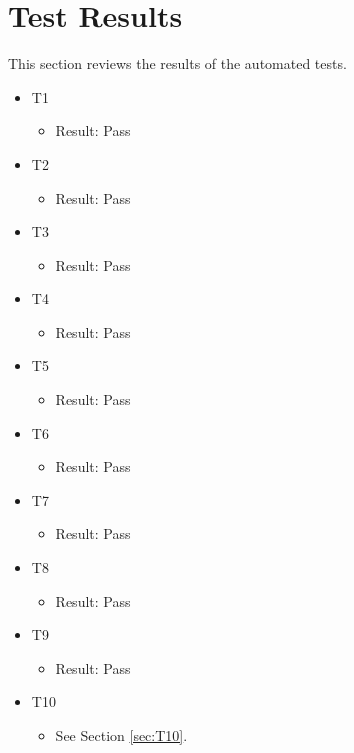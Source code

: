 \documentclass[12pt, titlepage]{article}
\begin{document}
\section{Test Results}
This section reviews the results of the automated tests.

\begin{itemize}
    \item T1
    \begin{itemize}
    \item Result: Pass
    \end{itemize}
    \item T2
    \begin{itemize}
    \item Result: Pass
    \end{itemize}
    \item T3
    \begin{itemize}
    \item Result: Pass
    \end{itemize}
    \item T4
    \begin{itemize}
    \item Result: Pass
    \end{itemize}
    \item T5
    \begin{itemize}
    \item Result: Pass
    \end{itemize}
    \item T6
    \begin{itemize}
    \item Result: Pass
    \end{itemize}
    \item T7
    \begin{itemize}
    \item Result: Pass
    \end{itemize}
    \item T8
    \begin{itemize}
    \item Result: Pass
    \end{itemize}
    \item T9
    \begin{itemize}
    \item Result: Pass
    \end{itemize}
    \item T10
    \begin{itemize}
    \item See Section \ref{sec:T10}.

\end{itemize}
\end{itemize}
\end{document}
